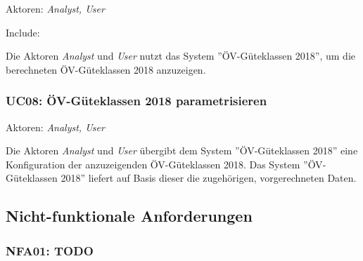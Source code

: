 Aktoren: \emph{Analyst, User}

Include: 

Die Aktoren \emph{Analyst} und \emph{User} nutzt das System ''\acs{ÖV}-Güteklassen 2018'', um die berechneten \acs{ÖV}-Güteklassen 2018 anzuzeigen.


\subsubsection{UC08: ÖV-Güteklassen 2018 parametrisieren}
\label{Use Cases:UC08}

Aktoren: \emph{Analyst, User}

Die Aktoren \emph{Analyst} und \emph{User} übergibt dem System ''\acs{ÖV}-Güteklassen 2018'' eine Konfiguration der anzuzeigenden \acs{ÖV}-Güteklassen 2018.
Das System ''\acs{ÖV}-Güteklassen 2018'' liefert auf Basis dieser die zugehörigen, vorgerechneten Daten.

\subsection{Nicht-funktionale Anforderungen}
\label{Anforderungsspezifikation:Nicht-funktionale Anforderungen}

\subsubsection{NFA01: TODO}
\label{NFA:NFA01}


